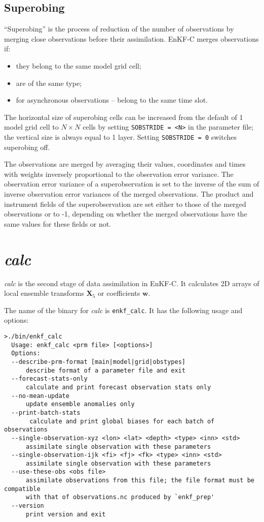 \documentclass[11pt]{report}
\newcommand{\mb} {\mathbf}
\begin{document}
\subsection{Superobing}

``Superobing'' is the process of reduction of the number of observations by merging close observations before their assimilation.
EnKF-C merges observations if:
\begin{itemize}
\item they belong to the same model grid cell;
\item are of the same type;
\item for asynchronous observations -- belong to the same time slot.
\end{itemize}
The horizontal size of superobing cells can be increased from the default of 1 model grid cell to $N \times N$ cells by setting \verb|SOBSTRIDE = <N>| in the parameter file; the vertical size is always equal to 1 layer.
Setting \verb|SOBSTRIDE = 0| switches superobing off.

The observations are merged by averaging their values, coordinates and times with weights inversely proportional to the observation error variance.
The observation error variance of a superobservation is set to the inverse of the sum of inverse observation error variances of the merged observations.
The product and instrument fields of the superobservation are set either to those of the merged observations or to -1, depending on whether the merged observations have the same values for these fields or not.

\section{\emph{calc}}

\emph{calc} is the second stage of data assimilation in EnKF-C.
It calculates 2D arrays of local ensemble transforms $\mb X_5$ or coefficients $\mb w$.

The name of the binary for \emph{calc} is \verb|enkf_calc|.
It has the following usage and options:
\begin{Verbatim}[frame=single,fontsize=\footnotesize]
>./bin/enkf_calc 
  Usage: enkf_calc <prm file> [<options>]
  Options:
  --describe-prm-format [main|model|grid|obstypes]
      describe format of a parameter file and exit
  --forecast-stats-only
      calculate and print forecast observation stats only
  --no-mean-update
      update ensemble anomalies only
  --print-batch-stats
       calculate and print global biases for each batch of observations
  --single-observation-xyz <lon> <lat> <depth> <type> <inn> <std>
      assimilate single observation with these parameters
  --single-observation-ijk <fi> <fj> <fk> <type> <inn> <std>
      assimilate single observation with these parameters
  --use-these-obs <obs file>
      assimilate observations from this file; the file format must be compatible
      with that of observations.nc produced by `enkf_prep'
  --version
      print version and exit
\end{Verbatim}
\end{document}
